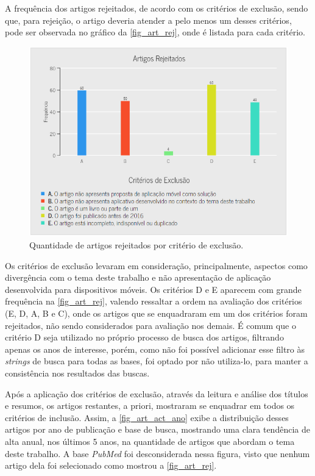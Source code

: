 \newpage

A frequência dos artigos rejeitados, de acordo com os critérios de exclusão, sendo que, para rejeição, o artigo deveria atender a pelo menos um desses critérios, pode ser observada no gráfico da \autoref{fig_art_rej}, onde é listada para cada critério.

\begin{figure}[htb]
  \caption{\label{fig_art_rej}Quantidade de artigos rejeitados por critério de exclusão.}
  \begin{center}
    \includegraphics[scale=0.6]{Imagens/msl/artigos_rejeitados.png}
  \end{center}
\end{figure}

Os critérios de exclusão levaram em consideração, principalmente, aspectos como divergência com o tema deste trabalho e não apresentação de aplicação desenvolvida para dispositivos móveis.
Os critérios D e E aparecem com grande frequência na \autoref{fig_art_rej}, valendo ressaltar a ordem na avaliação dos critérios (E, D, A, B e C), onde os artigos que se enquadraram em um dos critérios foram rejeitados, não sendo considerados para avaliação nos demais.
É comum que o critério D seja utilizado no próprio processo de busca dos artigos, filtrando apenas os anos de interesse, porém, como não foi possível adicionar esse filtro às \emph{strings} de busca para todas as bases, foi optado por não utiliza-lo, para manter a consistência nos resultados das buscas.

Após a aplicação dos critérios de exclusão, através da leitura e análise dos títulos e resumos, os artigos restantes, a priori, mostraram se enquadrar em todos os critérios de inclusão.
Assim, a \autoref{fig_art_act_ano} exibe a distribuição desses artigos por ano de publicação e base de busca, mostrando uma clara tendência de alta anual, nos últimos 5 anos, na quantidade de artigos que abordam o tema deste trabalho.
A base \emph{PubMed} foi desconsiderada nessa figura, visto que nenhum artigo dela foi selecionado como mostrou a \autoref{fig_art_rej}.


